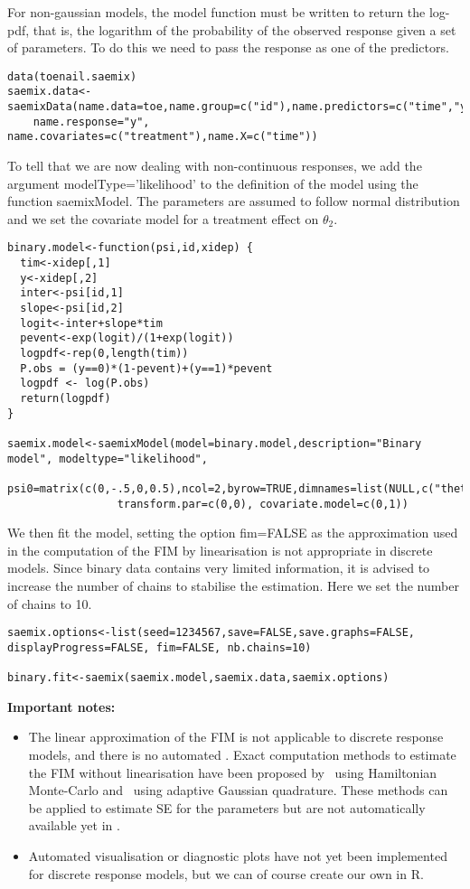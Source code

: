{For non-gaussian models, the model function must be written to return the log-pdf, that is, the logarithm of the probability of the observed response given a set of parameters. To do this we need to pass the response as one of the predictors.
\begin{verbatim}
data(toenail.saemix)
saemix.data<-saemixData(name.data=toe,name.group=c("id"),name.predictors=c("time","y"), 
    name.response="y", name.covariates=c("treatment"),name.X=c("time"))
\end{verbatim}

To tell \monolix that we are now dealing with non-continuous responses, we add the argument {\sf modelType='likelihood'} to the definition of the model using the function {\sf saemixModel}. The parameters are assumed to follow normal distribution and we set the covariate model for a treatment effect on $\theta_2$.

\begin{verbatim}
binary.model<-function(psi,id,xidep) {
  tim<-xidep[,1]
  y<-xidep[,2]
  inter<-psi[id,1]
  slope<-psi[id,2]
  logit<-inter+slope*tim
  pevent<-exp(logit)/(1+exp(logit))
  logpdf<-rep(0,length(tim))
  P.obs = (y==0)*(1-pevent)+(y==1)*pevent
  logpdf <- log(P.obs)
  return(logpdf)
}

saemix.model<-saemixModel(model=binary.model,description="Binary model", modeltype="likelihood",
                 psi0=matrix(c(0,-.5,0,0.5),ncol=2,byrow=TRUE,dimnames=list(NULL,c("theta1","theta2"))),
                 transform.par=c(0,0), covariate.model=c(0,1))
\end{verbatim}

We then fit the model, setting the option {\sf fim=FALSE} as the approximation used in the computation of the FIM by linearisation is not appropriate in discrete models. Since binary data contains very limited information, it is advised to increase the number of chains to stabilise the estimation. Here we set the number of chains to 10.
\begin{verbatim}
saemix.options<-list(seed=1234567,save=FALSE,save.graphs=FALSE, displayProgress=FALSE, fim=FALSE, nb.chains=10)

binary.fit<-saemix(saemix.model,saemix.data,saemix.options)
\end{verbatim}

{\bf Important notes:}
\begin{itemize}
\item The linear approximation of the FIM is not applicable to discrete response models, and there is no automated . Exact computation methods to estimate the FIM without linearisation have been proposed by~\cite{Riviere16} using Hamiltonian Monte-Carlo and~\cite{Ueckert16} using adaptive Gaussian quadrature. These methods can be applied to estimate SE for the parameters but are not automatically available yet in \monolix.
\item Automated visualisation or diagnostic plots have not yet been implemented for discrete response models, but we can of course create our own in R.
\end{itemize}

}
